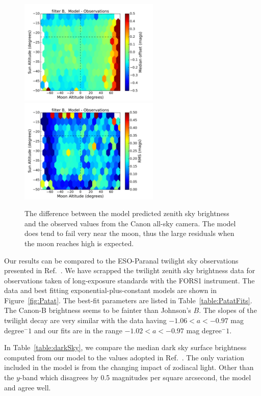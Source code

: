 \documentclass[]{spie}
\begin{document}
\begin{figure}[ht]
\begin{center}
  \includegraphics[height=5cm]{plots/zenithMedian_B_.pdf}\includegraphics[height=5cm]{plots/zenithRMS_B_.pdf}
  \end{center}
  \caption{ The difference between the model predicted zenith sky brightness and the observed values from the Canon all-sky camera.  The model does tend to fail very near the moon, thus the large residuals when the moon reaches high is expected.  \label{fig:zenithModel}}
\end{figure}


Our results can be compared to the ESO-Paranal twilight sky observations presented in Ref.~. We have scrapped the twilight zenith sky brightness data for observations taken of long-exposure standards with the FORS1 instrument.  The data and best fitting exponential-plus-constant models are shown in Figure~\ref{fig:Patat}.  The best-fit parameters are listed in Table~\ref{table:PatatFits}.  The Canon-B brightness seems to be fainter than Johnson's $B$.  The slopes of the twilight decay are very similar with the \cite{Patat06} data having $ -1.06  < a < -0.97 $ mag degree$^-1$ and our fits are in the range $ -1.02 < a < -0.97$ mag degree$^-1$.


In Table~\ref{table:darkSky}, we compare the median dark sky surface brightness computed from our model to the values adopted in Ref.~.  The only variation included in the model is from the changing impact of zodiacal light.  Other than the $y$-band which disagrees by 0.5 magnitudes per square arcsecond, the model and \cite{Ivezic08} agree well. 
\end{document}
